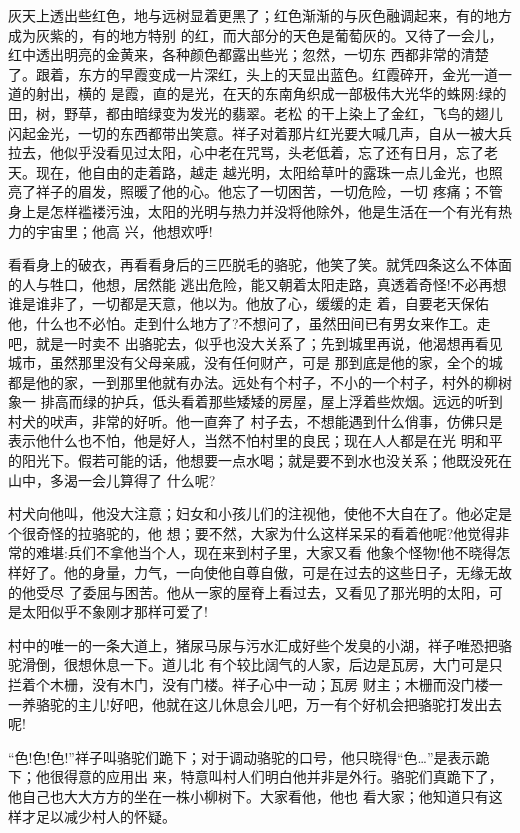 \documentclass[11pt,a4paper,onecolumn]{article}
\begin{document}
灰天上透出些红色，地与远树显着更黑了；红色渐渐的与灰色融调起来，有的地方成为灰紫的，有的地方特别
的红，而大部分的天色是葡萄灰的。又待了一会儿，红中透出明亮的金黄来，各种颜色都露出些光；忽然，一切东
西都非常的清楚了。跟着，东方的早霞变成一片深红，头上的天显出蓝色。红霞碎开，金光一道一道的射出，横的
是霞，直的是光，在天的东南角织成一部极伟大光华的蛛网:绿的田，树，野草，都由暗绿变为发光的翡翠。老松
的干上染上了金红，飞鸟的翅儿闪起金光，一切的东西都带出笑意。祥子对着那片红光要大喊几声，自从一被大兵
拉去，他似乎没看见过太阳，心中老在咒骂，头老低着，忘了还有日月，忘了老天。现在，他自由的走着路，越走
越光明，太阳给草叶的露珠一点儿金光，也照亮了祥子的眉发，照暖了他的心。他忘了一切困苦，一切危险，一切
疼痛；不管身上是怎样褴褛污浊，太阳的光明与热力并没将他除外，他是生活在一个有光有热力的宇宙里；他高
兴，他想欢呼!

看看身上的破衣，再看看身后的三匹脱毛的骆驼，他笑了笑。就凭四条这么不体面的人与牲口，他想，居然能
逃出危险，能又朝着太阳走路，真透着奇怪!不必再想谁是谁非了，一切都是天意，他以为。他放了心，缓缓的走
着，自要老天保佑他，什么也不必怕。走到什么地方了?不想问了，虽然田间已有男女来作工。走吧，就是一时卖不
出骆驼去，似乎也没大关系了；先到城里再说，他渴想再看见城市，虽然那里没有父母亲戚，没有任何财产，可是
那到底是他的家，全个的城都是他的家，一到那里他就有办法。远处有个村子，不小的一个村子，村外的柳树象一
排高而绿的护兵，低头看着那些矮矮的房屋，屋上浮着些炊烟。远远的听到村犬的吠声，非常的好听。他一直奔了
村子去，不想能遇到什么俏事，仿佛只是表示他什么也不怕，他是好人，当然不怕村里的良民；现在人人都是在光
明和平的阳光下。假若可能的话，他想要一点水喝；就是要不到水也没关系；他既没死在山中，多渴一会儿算得了
什么呢?

村犬向他叫，他没大注意；妇女和小孩儿们的注视他，使他不大自在了。他必定是个很奇怪的拉骆驼的，他
想；要不然，大家为什么这样呆呆的看着他呢?他觉得非常的难堪:兵们不拿他当个人，现在来到村子里，大家又看
他象个怪物!他不晓得怎样好了。他的身量，力气，一向使他自尊自傲，可是在过去的这些日子，无缘无故的他受尽
了委屈与困苦。他从一家的屋脊上看过去，又看见了那光明的太阳，可是太阳似乎不象刚才那样可爱了!

村中的唯一的一条大道上，猪尿马尿与污水汇成好些个发臭的小湖，祥子唯恐把骆驼滑倒，很想休息一下。道儿北
有个较比阔气的人家，后边是瓦房，大门可是只拦着个木栅，没有木门，没有门楼。祥子心中一动；瓦房\myrule
财主；木栅而没门楼一一养骆驼的主儿!好吧，他就在这儿休息会儿吧，万一有个好机会把骆驼打发出去呢!

``色!色!色!''祥子叫骆驼们跪下；对于调动骆驼的口号，他只晓得``色\ldots ''是表示跪下；他很得意的应用出
来，特意叫村人们明白他并非是外行。骆驼们真跪下了，他自己也大大方方的坐在一株小柳树下。大家看他，他也
看大家；他知道只有这样才足以减少村人的怀疑。
\end{document}
